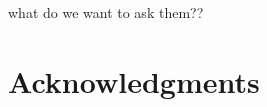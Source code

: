 \documentclass[fleqn,10pt]{SelfArx} %
\newcommand{\ed}[1]{{\color{blue} #1}}
\begin{document}
\ed{what do we want to ask them??}

\section*{Acknowledgments} %





\end{document}
